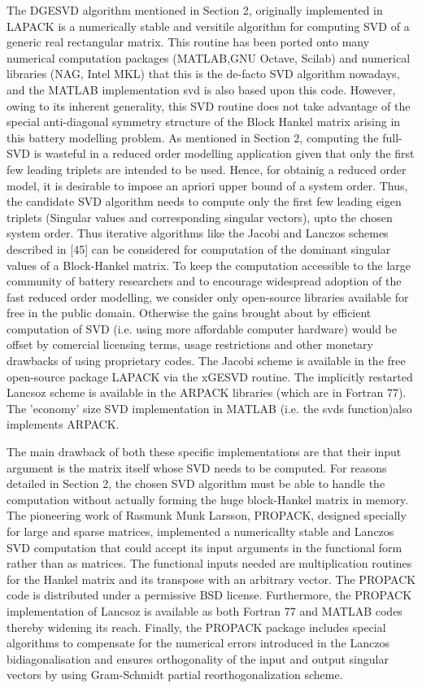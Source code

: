 The DGESVD algorithm mentioned in Section 2, originally implemented
in LAPACK is a numerically stable and versitile algorithm for computing
SVD of a generic real rectangular matrix. This routine has been ported
onto many numerical computation packages (MATLAB,GNU Octave, Scilab)
and numerical libraries (NAG, Intel MKL) that this is the de-facto
SVD algorithm nowadays, and the MATLAB implementation svd is also
based upon this code. However, owing to its inherent generality, this
SVD routine does not take advantage of the special anti-diagonal symmetry
structure of the Block Hankel matrix arising in this battery modelling
problem. As mentioned in Section 2, computing the full-SVD is wasteful
in a reduced order modelling application given that only the first
few leading triplets are intended to be used. Hence, for obtainig
a reduced order model, it is desirable to impose an apriori upper
bound of a system order. Thus, the candidate SVD algorithm needs to
compute only the first few leading eigen triplets (Singular values
and corresponding singular vectors), upto the chosen system order.
Thus iterative algorithms like the Jacobi and Lanczos schemes described
in {[}45{]} can be considered for computation of the dominant singular
values of a Block-Hankel matrix. To keep the computation accessible
to the large community of battery researchers and to encourage widespread
adoption of the fast reduced order modelling, we consider only open-source
libraries available for free in the public domain. Otherwise the gains
brought about by efficient computation of SVD (i.e. using more affordable
computer hardware) would be offset by comercial licensing terms, usage
restrictions and other monetary drawbacks of using proprietary codes.
The Jacobi scheme is available in the free open-source package LAPACK
via the xGESVD routine. The implicitly restarted Lancsoz scheme is
available in the ARPACK libraries (which are in Fortran 77). The 'economy'
size SVD implementation in MATLAB (i.e. the svds function)also implements
ARPACK.

The main drawback of both these specific implementations are that
their input argument is the matrix itself whose SVD needs to be computed.
For reasons detailed in Section 2, the chosen SVD algorithm must be
able to handle the computation without actually forming the huge block-Hankel
matrix in memory. The pioneering work of Rasmunk Munk Larsson, PROPACK,
designed specially for large and sparse matrices, implemented a numericallty
stable and Lanczos SVD computation that could accept its input arguments
in the functional form rather than as matrices. The functional inputs
needed are multiplication routines for the Hankel matrix and its transpose
with an arbitrary vector. The PROPACK code is distributed under a
permissive BSD license. Furthermore, the PROPACK implementation of
Lancsoz is available as both Fortran 77 and MATLAB codes thereby widening
its reach. Finally, the PROPACK package includes special algorithms
to compensate for the numerical errors introduced in the Lanczos bidiagonalisation
and ensures orthogonality of the input and output singular vectors
by using Gram-Schmidt partial reorthogonalization scheme.

